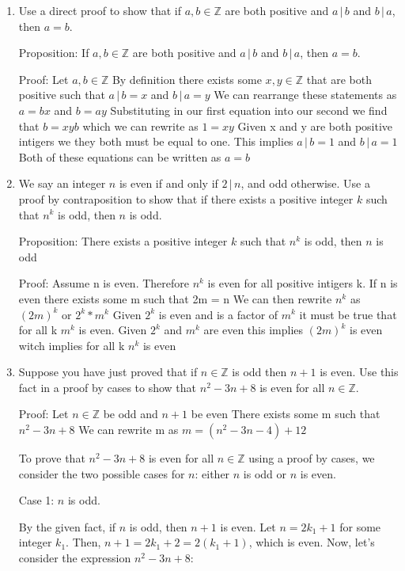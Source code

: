 \documentclass{article}
\newcommand{\bZ}{\mathbb{Z}}
\begin{document}
{\begin{enumerate}[labelindent=0pt,leftmargin=0pt]
\item Use a direct proof to show that if $a,b\in\bZ$ are both positive
and $a\,|\,b$ and $b\,|\,a$, then $a=b$.

Proposition: If $a,b\in\bZ$ are both positive and $a\,|\,b$ and $b\,|\,a$, then $a=b$.

Proof: Let $a,b\in\bZ$ 
By definition there exists some $x,y\in\bZ$ that are both positive such that $a\,|\,b = x$ and $b\,|\,a = y$
We can rearrange these statements as $a = bx$ and $b = ay$
Substituting in our first equation into our second we find that $b = xyb$ which we can rewrite as $1 = xy$ Given x and y are both positive intigers we they both must be equal to one. 
This implies $a\,|\,b = 1$ and $b\,|\,a = 1$
Both of these equations can be written as $a = b$

\item We say an integer $n$ is even if and only if $2\,|\,n$, and odd
otherwise. Use a proof by contraposition to show that if there exists a
positive integer $k$ such that $n^k$ is odd, then $n$ is odd.

Proposition: There exists a positive integer $k$ such that $n^k$ is odd, then $n$ is odd

Proof: Assume n is even. Therefore $n^k$ is even for all positive intigers k.
If n is even there exists some m such that 2m = n
We can then rewrite $n^k$ as $(2m)^k$ or $2^k * m^k$
Given $2^k$ is even and is a factor of $m^k$ it must be true that for  all  k $m^k$ is even. 
Given $2^k$ and $m^k$ are even this implies $(2m)^k$ is even witch implies for all k $n^k$ is even

\item Suppose you have just proved that if $n\in\bZ$ is odd then $n+1$
is even. Use this fact in a proof by cases to show that $n^2-3n+8$ is even
for all $n\in\bZ$.

Proof: Let $n\in\bZ$ be odd and $n+1$ be even
There exists some m such that $n^2-3n+8$ 
We can rewrite m as $m = (n^2-3n-4)+12$ 




\vspace{100pt}





To prove that $n^2 - 3n + 8$ is even for all $n \in \mathbb{Z}$ using a proof by cases, we consider the two possible cases for $n$: either $n$ is odd or $n$ is even.

Case 1: $n$ is odd.

By the given fact, if $n$ is odd, then $n + 1$ is even. Let $n = 2k_1 + 1$ for some integer $k_1$. Then, $n + 1 = 2k_1 + 2 = 2(k_1 + 1)$, which is even. Now, let's consider the expression $n^2 - 3n + 8$:


\end{enumerate}}
\end{document}
